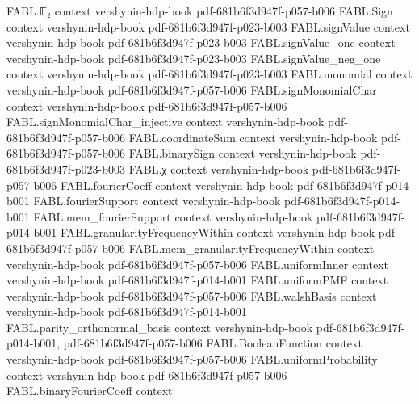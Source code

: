 \begin{theorem}
\label{FABL.absoluteTail_le_two_mul_exp}
\leanok
{}
\proofstep
  {FABL.𝔽₂}
  {context}
  {vershynin-hdp-book}
  {pdf-681b6f3d947f-p057-b006}
\proofstep
  {FABL.Sign}
  {context}
  {vershynin-hdp-book}
  {pdf-681b6f3d947f-p023-b003}
\proofstep
  {FABL.signValue}
  {context}
  {vershynin-hdp-book}
  {pdf-681b6f3d947f-p023-b003}
\proofstep
  {FABL.signValue_one}
  {context}
  {vershynin-hdp-book}
  {pdf-681b6f3d947f-p023-b003}
\proofstep
  {FABL.signValue_neg_one}
  {context}
  {vershynin-hdp-book}
  {pdf-681b6f3d947f-p023-b003}
\proofstep
  {FABL.monomial}
  {context}
  {vershynin-hdp-book}
  {pdf-681b6f3d947f-p057-b006}
\proofstep
  {FABL.signMonomialChar}
  {context}
  {vershynin-hdp-book}
  {pdf-681b6f3d947f-p057-b006}
\proofstep
  {FABL.signMonomialChar_injective}
  {context}
  {vershynin-hdp-book}
  {pdf-681b6f3d947f-p057-b006}
\proofstep
  {FABL.coordinateSum}
  {context}
  {vershynin-hdp-book}
  {pdf-681b6f3d947f-p057-b006}
\proofstep
  {FABL.binarySign}
  {context}
  {vershynin-hdp-book}
  {pdf-681b6f3d947f-p023-b003}
\proofstep
  {FABL.χ}
  {context}
  {vershynin-hdp-book}
  {pdf-681b6f3d947f-p057-b006}
\proofstep
  {FABL.fourierCoeff}
  {context}
  {vershynin-hdp-book}
  {pdf-681b6f3d947f-p014-b001}
\proofstep
  {FABL.fourierSupport}
  {context}
  {vershynin-hdp-book}
  {pdf-681b6f3d947f-p014-b001}
\proofstep
  {FABL.mem_fourierSupport}
  {context}
  {vershynin-hdp-book}
  {pdf-681b6f3d947f-p014-b001}
\proofstep
  {FABL.granularityFrequencyWithin}
  {context}
  {vershynin-hdp-book}
  {pdf-681b6f3d947f-p057-b006}
\proofstep
  {FABL.mem_granularityFrequencyWithin}
  {context}
  {vershynin-hdp-book}
  {pdf-681b6f3d947f-p057-b006}
\proofstep
  {FABL.uniformInner}
  {context}
  {vershynin-hdp-book}
  {pdf-681b6f3d947f-p014-b001}
\proofstep
  {FABL.uniformPMF}
  {context}
  {vershynin-hdp-book}
  {pdf-681b6f3d947f-p057-b006}
\proofstep
  {FABL.walshBasis}
  {context}
  {vershynin-hdp-book}
  {pdf-681b6f3d947f-p014-b001}
\proofstep
  {FABL.parity_orthonormal_basis}
  {context}
  {vershynin-hdp-book}
  {pdf-681b6f3d947f-p014-b001,
    pdf-681b6f3d947f-p057-b006}
\proofstep
  {FABL.BooleanFunction}
  {context}
  {vershynin-hdp-book}
  {pdf-681b6f3d947f-p057-b006}
\proofstep
  {FABL.uniformProbability}
  {context}
  {vershynin-hdp-book}
  {pdf-681b6f3d947f-p057-b006}
\proofstep
  {FABL.binaryFourierCoeff}
  {context}

\end{theorem}
